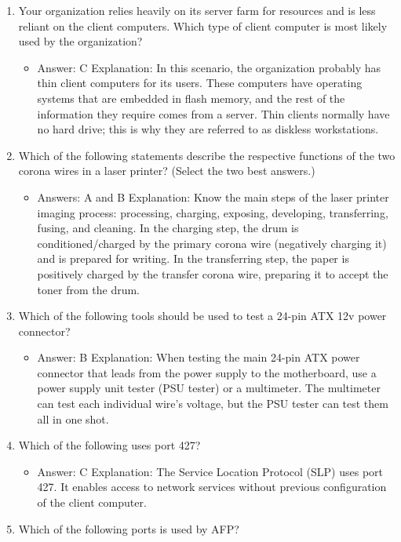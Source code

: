 \documentclass{article}
\begin{document}
\begin{enumerate}
    \item Your organization relies heavily on its server farm for resources
and is less reliant on the client computers. Which type of client
computer is most likely used by the organization?
    \begin{itemize}
        \item Answer: C
Explanation: In this scenario, the organization probably has thin client computers
for its users. These computers have operating systems that are embedded in flash
memory, and the rest of the information they require comes from a server. Thin clients
normally have no hard drive; this is why they are referred to as diskless workstations.
    \end{itemize}
    \item Which of the following statements describe the respective functions
of the two corona wires in a laser printer? (Select the two
best answers.)
    \begin{itemize}
        \item Answers: A and B
Explanation: Know the main steps of the laser printer imaging process: processing,
charging, exposing, developing, transferring, fusing, and cleaning. In the charging step,
the drum is conditioned/charged by the primary corona wire (negatively charging it)
and is prepared for writing. In the transferring step, the paper is positively charged by
the transfer corona wire, preparing it to accept the toner from the drum.
    \end{itemize}
    \item Which of the following tools should be used to test a 24-pin ATX
12v power connector?
    \begin{itemize}
        \item Answer: B
Explanation: When testing the main 24-pin ATX power connector that leads from the
power supply to the motherboard, use a power supply unit tester (PSU tester) or a
multimeter. The multimeter can test each individual wire’s voltage, but the PSU tester
can test them all in one shot.
    \end{itemize}
    \item Which of the following uses port 427?
    \begin{itemize}
        \item Answer: C
Explanation: The Service Location Protocol (SLP) uses port 427. It enables access to
network services without previous configuration of the client computer.
    \end{itemize}
    \item Which of the following ports is used by AFP?

\end{enumerate}
\end{document}

